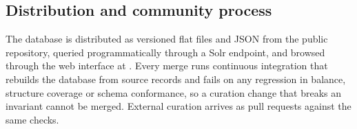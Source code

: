 \subsection{Distribution and community process}\label{sec:methods-distribution}

The database is distributed as versioned flat files and JSON from the public
repository, queried programmatically through a Solr endpoint, and browsed
through the web interface at \modelseedurl. Every merge runs
continuous integration that rebuilds the database from source records and
fails on any regression in balance, structure coverage or schema conformance,
so a curation change that breaks an invariant cannot be merged. External
curation arrives as pull requests against the same checks.
